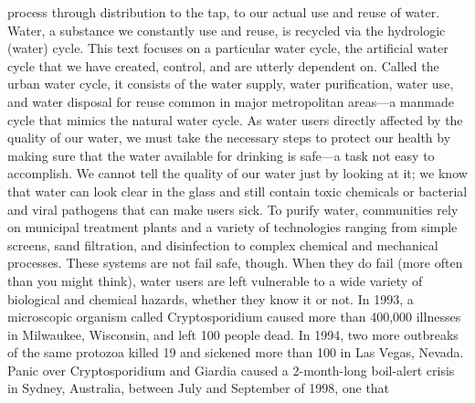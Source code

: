 \documentclass{article}
\begin{document}
process through distribution to the tap, to our actual use and reuse of
water. Water, a substance we constantly use and reuse, is recycled via
the hydrologic (water) cycle. This text focuses on a particular water
cycle, the artificial water cycle that we have created, control, and are
utterly dependent on. Called the urban water cycle, it consists of the
water supply, water purification, water use, and water disposal for
reuse common in major metropolitan areas---a manmade cycle that mimics
the natural water cycle. As water users directly affected by the quality
of our water, we must take the necessary steps to protect our health by
making sure that the water available for drinking is safe---a task not
easy to accomplish. We cannot tell the quality of our water just by
looking at it; we know that water can look clear in the glass and still
contain toxic chemicals or bacterial and viral pathogens that can make
users sick. To purify water, communities rely on municipal treatment
plants and a variety of technologies ranging from simple screens, sand
filtration, and disinfection to complex chemical and mechanical
processes. These systems are not fail safe, though. When they do fail
(more often than you might think), water users are left vulnerable to a
wide variety of biological and chemical hazards, whether they know it or
not. In 1993, a microscopic organism called Cryptosporidium caused more
than 400,000 illnesses in Milwaukee, Wisconsin, and left 100 people
dead. In 1994, two more outbreaks of the same protozoa killed 19 and
sickened more than 100 in Las Vegas, Nevada. Panic over Cryptosporidium
and Giardia caused a 2-month-long boil-alert crisis in Sydney,
Australia, between July and September of 1998, one that
\end{document}
